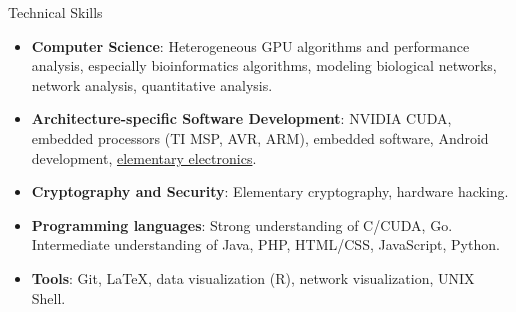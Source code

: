 \documentclass[11pt,oneside]{article}
\newenvironment{ressection}[1]{
	\vspace{4pt}
	{\textbf\selectfont\Large\fontspec{Roboto-Thin.ttf}\textcolor{Sepia}{#1}}
	\begin{itemize}[topsep=6pt]
	\vspace{0pt}
}{
	\end{itemize}
}
\newcommand{\resitem}[1]{
	\vspace{-4pt}
	\item \begin{flushleft} #1 \end{flushleft}
}
\newenvironment{reslist}[1]{
	\resitem{\textbf{#1}}
	\vspace{-5pt}
	\begin{itemize}
}{
	\end{itemize}
}
\begin{document}
	







\begin{ressection}{Technical Skills}
		
        \resitem{\textbf{Computer Science}: Heterogeneous GPU algorithms and performance analysis, especially bioinformatics algorithms, modeling biological networks, network analysis, quantitative analysis.}

        \resitem{\textbf{Architecture-specific Software Development}: NVIDIA CUDA, embedded processors (TI MSP, AVR, ARM), embedded software, Android development, \href{https://verify.edxonline.org/cert/e8322a7ae5cb463496f1ab2414c19596}{elementary electronics}.}
	
	    \resitem{\textbf{Cryptography and Security}: Elementary cryptography, hardware hacking.}
	

		\resitem{\textbf{Programming languages}: Strong understanding of C/CUDA, Go. Intermediate understanding of Java, PHP, HTML/CSS, JavaScript, Python.}
		
		\resitem{\textbf{Tools}: Git, LaTeX, data visualization (R), network visualization, UNIX Shell.}

		

\end{ressection}
\vspace{8 pt}
\end{document}
